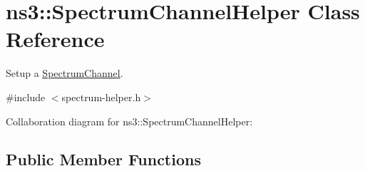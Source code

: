 \hypertarget{classns3_1_1SpectrumChannelHelper}{}\section{ns3\+:\+:Spectrum\+Channel\+Helper Class Reference}
\label{classns3_1_1SpectrumChannelHelper}


Setup a \hyperlink{classns3_1_1SpectrumChannel}{Spectrum\+Channel}.  




{\ttfamily \#include $<$spectrum-\/helper.\+h$>$}



Collaboration diagram for ns3\+:\+:Spectrum\+Channel\+Helper\+:
\subsection*{Public Member Functions}
